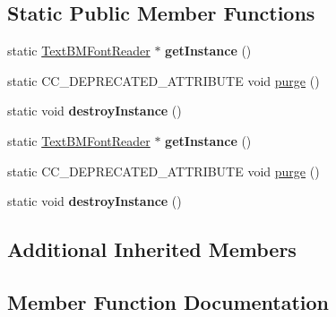 \subsection*{Static Public Member Functions}
\begin{DoxyCompactItemize}
\item 
\mbox{\label{classcocostudio_1_1TextBMFontReader_ae7d19c03ad04dee5d373c73e6ad7c62c}} 
static \hyperlink{classcocostudio_1_1TextBMFontReader}{Text\+B\+M\+Font\+Reader} $\ast$ {\bfseries get\+Instance} ()
\item 
static C\+C\+\_\+\+D\+E\+P\+R\+E\+C\+A\+T\+E\+D\+\_\+\+A\+T\+T\+R\+I\+B\+U\+TE void \hyperlink{classcocostudio_1_1TextBMFontReader_a817fe5ac71dc5dd9de811d70f209dc28}{purge} ()
\item 
\mbox{\label{classcocostudio_1_1TextBMFontReader_a07338659b97bd2f66137055853840346}} 
static void {\bfseries destroy\+Instance} ()
\item 
\mbox{\label{classcocostudio_1_1TextBMFontReader_a6c403545ae5d0565e4119e2858c21118}} 
static \hyperlink{classcocostudio_1_1TextBMFontReader}{Text\+B\+M\+Font\+Reader} $\ast$ {\bfseries get\+Instance} ()
\item 
static C\+C\+\_\+\+D\+E\+P\+R\+E\+C\+A\+T\+E\+D\+\_\+\+A\+T\+T\+R\+I\+B\+U\+TE void \hyperlink{classcocostudio_1_1TextBMFontReader_a817fe5ac71dc5dd9de811d70f209dc28}{purge} ()
\item 
\mbox{\label{classcocostudio_1_1TextBMFontReader_a08d460560c336b9b10e3dd5ff5dc8c81}} 
static void {\bfseries destroy\+Instance} ()
\end{DoxyCompactItemize}
\subsection*{Additional Inherited Members}


\subsection{Member Function Documentation}
\mbox{\label{classcocostudio_1_1TextBMFontReader_a817fe5ac71dc5dd9de811d70f209dc28}} 
